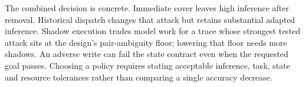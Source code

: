 The combined decision is concrete. Immediate cover leaves high inference after removal. Historical dispatch changes that attack but retains substantial adapted inference. Shadow execution trades model work for a trace whose strongest tested attack sits at the design's pair-ambiguity floor; lowering that floor needs more shadows. An adverse write can fail the state contract even when the requested goal passes. Choosing a policy requires stating acceptable inference, task, state and resource tolerances rather than comparing a single accuracy decrease.

